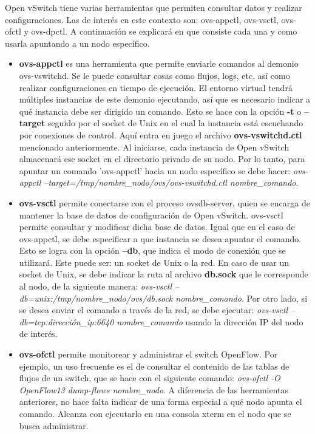 Open vSwitch tiene varias herramientas que permiten consultar datos y realizar configuraciones. Las de interés en este contexto son: ovs-appctl, ovs-vsctl, ovs-ofctl y ovs-dpctl. A continuación se explicará en que consiste cada una y como usarla apuntando a un nodo específico.
\begin{itemize}
	\item \textbf{ovs-appctl} \cite{ovs-appctl} es una herramienta que permite enviarle comandos al demonio ovs-vswitchd. Se le puede consultar cosas como flujos, logs, etc, así como realizar configuraciones en tiempo de ejecución. El entorno virtual tendrá múltiples instancias de este demonio ejecutando, así que es necesario indicar a qué instancia debe ser dirigido un comando. Esto se hace con la opción \textbf{-t} o \textbf{--target} seguido por el socket de Unix en el cual la instancia está escuchando por conexiones de control. Aquí entra en juego el archivo \textbf{ovs-vswitchd.ctl} mencionado anteriormente. Al iniciarse, cada instancia de Open vSwitch almacenará ese socket en el directorio privado de su nodo. Por lo tanto, para apuntar un comando 'ovs-appctl' hacia un nodo específico se debe hacer: \textit{ovs-appctl --target=/tmp/nombre\_nodo/ovs/ovs-vswitchd.ctl nombre\_comando}.
	\item \textbf{ovs-vsctl} \cite{ovs-vsctl} permite conectarse con el proceso ovsdb-server, quien se encarga de mantener la base de datos de configuración de Open vSwitch. ovs-vsctl permite consultar y modificar dicha base de datos. Igual que en el caso de ovs-appctl, se debe especificar a que instancia se desea apuntar el comando. Esto se logra con la opción \textbf{--db}, que indica el modo de conexión que se utilizará. Este puede ser: un socket de Unix o la red. En caso de usar un socket de Unix, se debe indicar la ruta al archivo \textbf{db.sock} que le corresponde al nodo, de la siguiente manera: \textit{ovs-vsctl --db=unix:/tmp/nombre\_nodo/ovs/db.sock nombre\_comando}. Por otro lado, si se desea enviar el comando a través de la red, se debe ejecutar: \textit{ovs-vsctl --db=tcp:dirección\_ip:6640 nombre\_comando} usando la dirección IP del nodo de interés.
	\item \textbf{ovs-ofctl} \cite{ovs-ofctl} permite monitorear y administrar el switch OpenFlow. Por ejemplo, un uso frecuente es el de consultar el contenido de las tablas de flujos de un switch, que se hace con el siguiente comando: \textit{ovs-ofctl -O OpenFlow13 dump-flows nombre\_nodo}. A diferencia de las herramientas anteriores, no hace falta indicar de una forma especial a qué nodo apunta el comando. Alcanza con ejecutarlo en una consola xterm en el nodo que se busca administrar.

\end{itemize}
